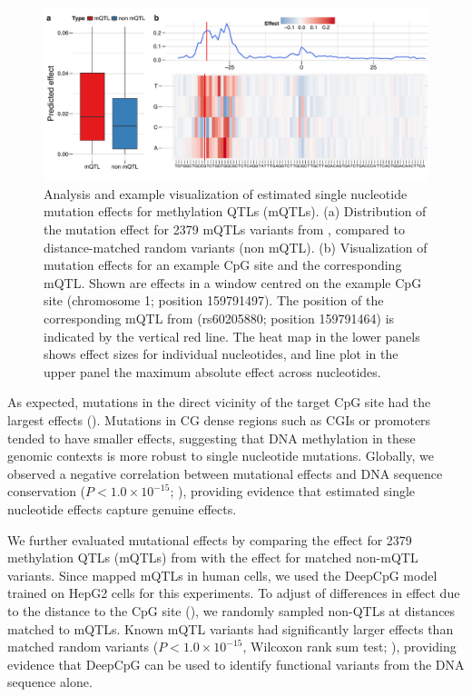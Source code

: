 \begin{figure}[htbp!]
\centering
\includegraphics[width=1.0\textwidth]{mut_qtl_zoom}
\caption[Analysis and example visualization of estimated single nucleotide mutation effects for methylation QTLs (mQTLs).]{Analysis and example visualization of estimated single nucleotide mutation effects for methylation QTLs (mQTLs). (a) Distribution of the mutation effect for 2379 mQTLs variants from \citet{kaplow_pooling-based_2015}, compared to distance-matched random variants (non mQTL). (b) Visualization of mutation effects for an example CpG site and the corresponding mQTL. Shown are effects in a window centred on the example CpG site (chromosome 1; position 159791497). The position of the corresponding mQTL from \citet{kaplow_pooling-based_2015} (rs60205880; position 159791464) is indicated by the vertical red line. The heat map in the lower panels shows effect sizes for individual nucleotides, and line plot in the upper panel the maximum absolute effect across nucleotides.}
\label{fig:dcpg_mut_qtl_zoom}
\end{figure}

As expected, mutations in the direct vicinity of the target CpG site had the largest effects (). Mutations in CG dense regions such as CGIs or promoters tended to have smaller effects, suggesting that DNA methylation in these genomic contexts is more robust to single nucleotide mutations. Globally, we observed a negative correlation between mutational effects and DNA sequence conservation ($P<1.0\times10^{-15}$; ), providing evidence that estimated single nucleotide effects capture genuine effects.

We further evaluated mutational effects by comparing the effect for 2379 methylation QTLs (mQTLs) from \citet{kaplow_pooling-based_2015} with the effect for matched non-mQTL variants. Since \citet{kaplow_pooling-based_2015} mapped mQTLs in human cells, we used the DeepCpG model trained on HepG2 cells for this experiments. To adjust of differences in effect due to the distance to the CpG site (), we randomly sampled non-QTLs at distances matched to mQTLs. Known mQTL variants had significantly larger effects than matched random variants ($P<1.0\times10^{-15}$, Wilcoxon rank sum test; ), providing evidence that DeepCpG can be used to identify functional variants from the DNA sequence alone.


